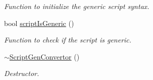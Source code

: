 \begin{DoxyCompactItemize}
\begin{DoxyCompactList}\small\item\em Function to initialize the generic script syntax. \item\end{DoxyCompactList}\item 
\hypertarget{classScriptGenConvertor_a68a898be8895636a6eefe554fba85dcb}{
bool \hyperlink{classScriptGenConvertor_a68a898be8895636a6eefe554fba85dcb}{scriptIsGeneric} ()}
\label{classScriptGenConvertor_a68a898be8895636a6eefe554fba85dcb}

\begin{DoxyCompactList}\small\item\em Function to check if the script is generic. \item\end{DoxyCompactList}\item 
\hypertarget{classScriptGenConvertor_a4442698edc5d4a92edb852814d380d06}{
\hyperlink{classScriptGenConvertor_a4442698edc5d4a92edb852814d380d06}{$\sim$ScriptGenConvertor} ()}
\label{classScriptGenConvertor_a4442698edc5d4a92edb852814d380d06}

\begin{DoxyCompactList}\small\item\em Destructor. \item\end{DoxyCompactList}\end{DoxyCompactItemize}

